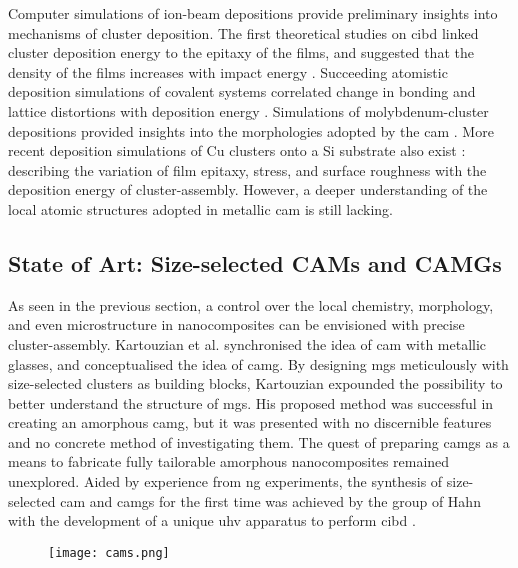 Computer simulations of ion-beam depositions provide preliminary insights into mechanisms of cluster deposition. The first theoretical studies on \gls{cibd} linked cluster deposition energy to the epitaxy of the films, and suggested that the density of the films increases with impact energy \cite{Muller1987,Cleveland1992}. Succeeding atomistic deposition simulations of covalent systems correlated change in bonding and lattice distortions with deposition energy \cite{Albe1998}. Simulations of molybdenum-cluster depositions provided insights into the morphologies adopted by the \gls{cam} \cite{Haberland1993,Haberland1995}. More recent deposition simulations of Cu clusters onto a Si substrate also exist \cite{Hwang2012,Gong2012}: describing the variation of film epitaxy, stress, and surface roughness with the deposition energy of cluster-assembly. However, a deeper understanding of the local atomic structures adopted in metallic \gls{cam} is still lacking. \par

\subsection{State of Art: Size-selected CAMs and CAMGs} \label{s:camg-uhv}
As seen in the previous section, a control over the local chemistry, morphology, and even microstructure in nanocomposites can be envisioned with precise cluster-assembly. Kartouzian et al. \cite{Kartouzian2013,Kartouzian2014} synchronised the idea of \gls{cam} with metallic glasses, and conceptualised the idea of \acrfull{camg}. By designing \gls{mg}s meticulously with size-selected clusters as building blocks, Kartouzian expounded the possibility to better understand the structure of \gls{mg}s. His proposed method was successful in creating an amorphous \gls{camg}, but it was presented with no discernible features and no concrete method of investigating them. The quest of preparing \gls{camg}s as a means to fabricate fully tailorable amorphous nanocomposites remained unexplored. Aided by experience from \gls{ng} experiments, the synthesis of size-selected \gls{cam} and \gls{camg}s for the first time was achieved by the group of Hahn with the development of a unique \gls{uhv} apparatus to perform \gls{cibd} \cite{Fischer2015,Fischer2015a,Benel2018}. 

\begin{figure}[!ht] \centering
	\texttt{[image: cams.png]}
	\label{f:camg-sch}
\end{figure}

